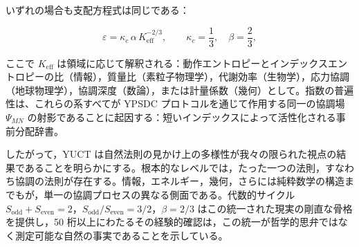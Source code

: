 \documentclass[11pt,a4paper]{article}
\newcommand{\Sodd}{S_{\mathrm{odd}}}
\newcommand{\Seven}{S_{\mathrm{even}}}
\begin{document}
	いずれの場合も支配方程式は同じである：
	
	\begin{equation}
		\boxed{ \varepsilon = \kappa_c \, \alpha \, K_{\mathrm{eff}}^{-2/3} },
		\qquad \kappa_c = \frac{1}{3},\quad \beta = \frac{2}{3},
	\end{equation}
	
	ここで \(K_{\mathrm{eff}}\) は領域に応じて解釈される：動作エントロピーとインデックスエントロピーの比（情報），質量比（素粒子物理学），代謝効率（生物学），応力協調（地球物理学），協調深度（数論），または計量係数（幾何）として。指数の普遍性は、これらの系すべてが YPSDC プロトコルを通じて作用する同一の協調場 \(\Psi_{MN}\) の射影であることに起因する：短いインデックスによって活性化される事前分配辞書。
	
	したがって，YUCT は自然法則の見かけ上の多様性が我々の限られた視点の結果であることを明らかにする。根本的なレベルでは，たった一つの法則，すなわち協調の法則が存在する。情報，エネルギー，幾何，さらには純粋数学の構造までもが，単一の協調プロセスの異なる側面である。代数的サイクル \(\Sodd + \Seven = 2\)，\(\Sodd/\Seven = 3/2\)，\(\beta = 2/3\) はこの統一された現実の剛直な骨格を提供し，50 桁以上にわたるその経験的確認は，この統一が哲学的思弁ではなく測定可能な自然の事実であることを示している。
	
\end{document}
